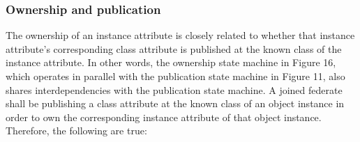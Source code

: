 \clearpage

\begin{compactstdpage}

    \subsubsection{Ownership and publication}


    The ownership of an instance attribute is closely related to whether that instance attribute's corresponding class attribute is published at the known class of the instance attribute. In other words, the ownership state machine in Figure 16, which operates in parallel with the publication state machine in Figure 11, also shares interdependencies with the publication state machine. A joined federate shall be publishing a class attribute at the known class of an object instance in order to own the corresponding instance attribute of that object instance. Therefore, the following are true:



\end{compactstdpage}
